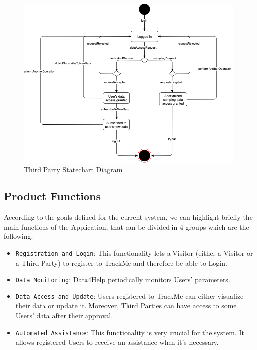 \documentclass[12pt,a4paper]{article}
\begin{document}
			\begin{figure}[H]
				\centering
				\includegraphics[width=1.0\linewidth]{Images/statechart_third_party}
				\caption{Third Party Statechart Diagram}
				\label{fig:statechart_third_party}
			\end{figure}

		\newpage
		\subsection{Product Functions}
			According to the goals defined for the current system, we can highlight briefly the main functions of the Application, that can be divided in 4 groups which are the following:
			\begin{itemize}
				\item \texttt{Registration and Login}: This functionality lets a Visitor (either a Visitor or a Third Party) to register to TrackMe and therefore be able to Login.
				\item \texttt{Data Monitoring}: Data4Help periodically monitors Users' parameters.
				\item \texttt{Data Access and Update}: Users registered to TrackMe can either visualize their data or update it. Moreover, Third Parties can have access to some Users' data after their approval.
				\item \texttt{Automated Assistance}: This functionality is very crucial for the system. It allows registered Users to receive an assistance when it's necessary.
			\end{itemize}
	
		\newpage
\end{document}
